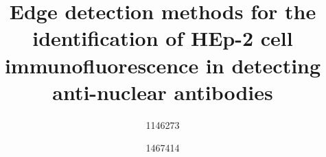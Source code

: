 \documentclass{article}
\begin{document}

\title{Edge detection methods for the identification of HEp-2 cell immunofluorescence in detecting anti-nuclear antibodies} %






\author{1146273
\and 1467414}


\maketitle %
\end{document}
